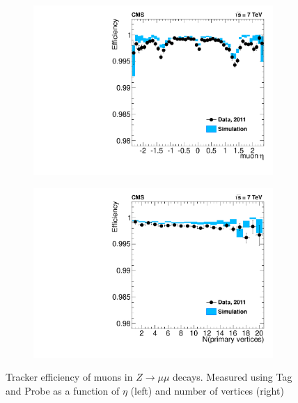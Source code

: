 \begin{figure}[t]
  \centering
 \begin{subfigure}[b]{.4\textwidth}
	\includegraphics[width=\textwidth]{images/TrackerEffEta.pdf}
  \end{subfigure}
  \begin{subfigure}[b]{.4\textwidth}
	\includegraphics[width=\textwidth]{images/TrackerEffVtx.pdf}
  \end{subfigure}
  	\caption[Tracker Performance]
   	{Tracker efficiency of muons in $Z\rightarrow\mu\mu$ decays. Measured using Tag and Probe as a function of $\eta$ (left) and number of vertices (right)}
	\label{fig:TrackerPerformance}
\end{figure}

